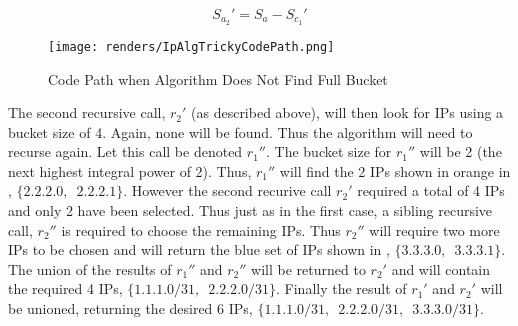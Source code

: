\begin{equation}\label{eq:availableIpsSecondRecurse}
S_{a_2}' = S_a - S_{c_1}'
\end{equation}

\begin{figure}[H]
      \centering
      \texttt{[image: renders/IpAlgTrickyCodePath.png]}
      \caption{Code Path when Algorithm Does Not Find Full Bucket}
      \label{fig:ipAlgTrickyCodePath}
\end{figure}

The second recursive call, $r_2'$ (as described above), will then look for IPs using a bucket size of 4. Again, none will be found. Thus the algorithm will need to recurse again. Let this call be denoted $r_1''$. The bucket size for $r_1''$ will be 2 (the next highest integral power of 2). Thus, $r_1''$ will find the 2 IPs shown in orange in , $\{2.2.2.0,\enspace2.2.2.1\}$. However the second recurive call $r_2'$ required a total of 4 IPs and only 2 have been selected. Thus just as in the first case, a sibling recursive call, $r_2''$ is required to choose the remaining IPs. Thus $r_2''$ will require two more IPs to be chosen and will return the blue set of IPs shown in , $\{3.3.3.0,\enspace3.3.3.1\}$. The union of the results of $r_1''$ and $r_2''$ will be returned to $r_2'$ and will contain the required 4 IPs, $\{1.1.1.0/31,\enspace2.2.2.0/31\}$. Finally the result of $r_1'$ and $r_2'$ will be unioned, returning the desired 6 IPs, $\{1.1.1.0/31,\enspace2.2.2.0/31,\enspace3.3.3.0/31\}$.

